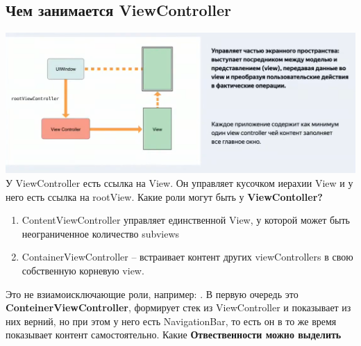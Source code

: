 \documentclass{article}
\begin{document}
    \subsection{Чем занимается ViewController}
    \includegraphics[scale = 0.5]{pic/Снимок экрана 2023-08-02 в 20.27.31.png}
    \newline
    У ViewController есть ссылка на View. Он управляет кусочком иерахии View и у него есть ссылка на rootView.
    \newline
    Какие роли могут быть у \textbf{ViewContoller?}
    \begin{enumerate}
        \item ContentViewController управляет единственной View, у которой может быть неограниченное количество subviews
        \item ContainerViewController -- встраивает контент других viewControllers в свою собственную корневую view. 
    \end{enumerate}
    Это не взиамоисключающие роли, например: . В первую очередь это \textbf{ConteinerViewController}, формирует стек из ViewController и показывает из них верний, но при этом у него есть NavigationBar, то есть он в то же время показывает контент самостоятельно. 
    \newline
    Какие \textbf{Отвественности можно выделить}
\end{document}
